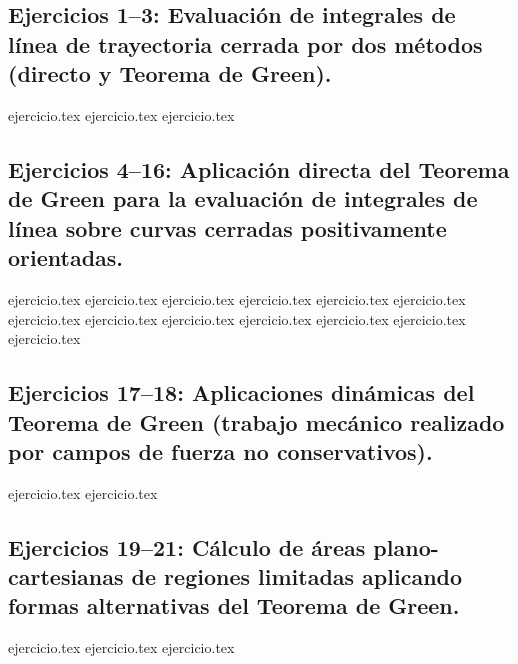 
\subsection*{Ejercicios 1--3: Evaluación de integrales de línea de trayectoria cerrada por dos métodos (directo y Teorema de Green).}
\begin{enumerate}
    {ejercicio.tex}
    {ejercicio.tex}
    {ejercicio.tex}
\end{enumerate}

\subsection*{Ejercicios 4--16: Aplicación directa del Teorema de Green para la evaluación de integrales de línea sobre curvas cerradas positivamente orientadas.}
\begin{enumerate}
    \setcounter{enumi}{3}
    {ejercicio.tex}
    {ejercicio.tex}
    {ejercicio.tex}
    {ejercicio.tex}
    {ejercicio.tex}
    {ejercicio.tex}
    {ejercicio.tex}
    {ejercicio.tex}
    {ejercicio.tex}
    {ejercicio.tex}
    {ejercicio.tex}
    {ejercicio.tex}
    {ejercicio.tex}
\end{enumerate}

\subsection*{Ejercicios 17--18: Aplicaciones dinámicas del Teorema de Green (trabajo mecánico realizado por campos de fuerza no conservativos).}
\begin{enumerate}
    \setcounter{enumi}{16}
    {ejercicio.tex}
    {ejercicio.tex}
\end{enumerate}

\subsection*{Ejercicios 19--21: Cálculo de áreas plano-cartesianas de regiones limitadas aplicando formas alternativas del Teorema de Green.}
\begin{enumerate}
    \setcounter{enumi}{18}
    {ejercicio.tex}
    {ejercicio.tex}
    {ejercicio.tex}
\end{enumerate}

